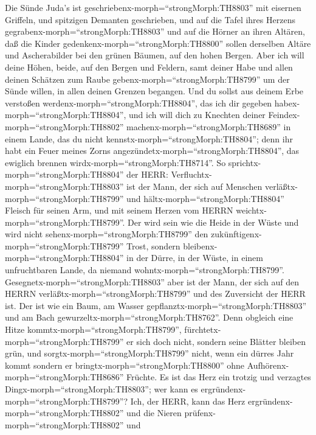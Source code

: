  Die Sünde Juda's ist
geschriebenx-morph=``strongMorph:TH8803'' mit eisernen Griffeln, und
spitzigen Demanten geschrieben, und auf die Tafel ihres Herzens
gegrabenx-morph=``strongMorph:TH8803'' und auf die Hörner an ihren
Altären,  daß die Kinder
gedenkenx-morph=``strongMorph:TH8800'' sollen derselben Altäre und
Ascherabilder bei den grünen Bäumen, auf den hohen Bergen. 
Aber ich will deine Höhen, beide, auf den Bergen und Feldern, samt
deiner Habe und allen deinen Schätzen zum Raube
gebenx-morph=``strongMorph:TH8799'' um der Sünde willen, in allen deinen
Grenzen begangen.  Und du sollst aus deinem Erbe verstoßen
werdenx-morph=``strongMorph:TH8804'', das ich dir gegeben
habex-morph=``strongMorph:TH8804'', und ich will dich zu Knechten deiner
Feindex-morph=``strongMorph:TH8802''
machenx-morph=``strongMorph:TH8689'' in einem Lande, das du nicht
kennstx-morph=``strongMorph:TH8804''; denn ihr habt ein Feuer meines
Zorns angezündetx-morph=``strongMorph:TH8804'', das ewiglich brennen
wirdx-morph=``strongMorph:TH8714''.  So
sprichtx-morph=``strongMorph:TH8804'' der HERR:
Verfluchtx-morph=``strongMorph:TH8803'' ist der Mann, der sich auf
Menschen verläßtx-morph=``strongMorph:TH8799'' und
hältx-morph=``strongMorph:TH8804'' Fleisch für seinen Arm, und mit
seinem Herzen vom HERRN weichtx-morph=``strongMorph:TH8799''.
 Der wird sein wie die Heide in der Wüste und wird nicht
sehenx-morph=``strongMorph:TH8799'' den
zukünftigenx-morph=``strongMorph:TH8799'' Trost, sondern
bleibenx-morph=``strongMorph:TH8804'' in der Dürre, in der Wüste, in
einem unfruchtbaren Lande, da niemand
wohntx-morph=``strongMorph:TH8799''. 
Gesegnetx-morph=``strongMorph:TH8803'' aber ist der Mann, der sich auf
den HERRN verläßtx-morph=``strongMorph:TH8799'' und des Zuversicht der
HERR ist.  Der ist wie ein Baum, am Wasser
gepflanztx-morph=``strongMorph:TH8803'' und am Bach
gewurzeltx-morph=``strongMorph:TH8762''. Denn obgleich eine Hitze
kommtx-morph=``strongMorph:TH8799'',
fürchtetx-morph=``strongMorph:TH8799'' er sich doch nicht, sondern seine
Blätter bleiben grün, und sorgtx-morph=``strongMorph:TH8799'' nicht,
wenn ein dürres Jahr kommt sondern er
bringtx-morph=``strongMorph:TH8800'' ohne
Aufhörenx-morph=``strongMorph:TH8686'' Früchte.  Es ist das
Herz ein trotzig und verzagtes Dingx-morph=``strongMorph:TH8803''; wer
kann es ergründenx-morph=``strongMorph:TH8799''?  Ich, der
HERR, kann das Herz ergründenx-morph=``strongMorph:TH8802'' und die
Nieren prüfenx-morph=``strongMorph:TH8802'' und
